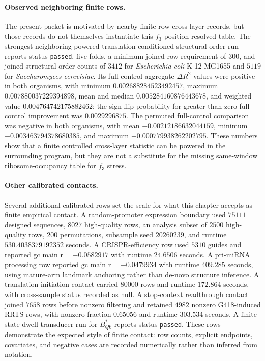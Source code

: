 \paragraph{Observed neighboring finite rows.}
The present packet is motivated by nearby finite-row cross-layer records, but those records do not themselves instantiate this $f_3$ position-resolved table.  The strongest neighboring powered translation-conditioned structural-order run reports status \texttt{passed}, five folds, a minimum joined-row requirement of $300$, and joined structural-order counts of $3412$ for \textit{Escherichia coli} K-12 MG1655 and $5119$ for \textit{Saccharomyces cerevisiae}.  Its full-control aggregate $\Delta R^2$ values were positive in both organisms, with minimum $0.002688284523492457$, maximum $0.007880037229394898$, mean and median $0.005284160876443678$, and weighted value $0.004764742175882462$; the sign-flip probability for greater-than-zero full-control improvement was $0.0029296875$.  The permuted full-control comparison was negative in both organisms, with mean $-0.00212186632044159$, minimum $-0.003463794378680385$, and maximum $-0.000779938262202795$.  These numbers show that a finite controlled cross-layer statistic can be powered in the surrounding program, but they are not a substitute for the missing same-window ribosome-occupancy table for $f_3$ stress.

\paragraph{Other calibrated contacts.}
Several additional calibrated rows set the scale for what this chapter accepts as finite empirical contact.  A random-promoter expression boundary used $75111$ designed sequences, $8027$ high-quality rows, an analysis subset of $2500$ high-quality rows, $200$ permutations, subsample seed $20260239$, and runtime $530.4038379192352$ seconds.  A CRISPR-efficiency row used $5310$ guides and reported $\mathrm{gc\_main\_r}=-0.0582917$ with runtime $24.6506$ seconds.  A pri-miRNA processing row reported $\mathrm{gc\_main\_r}=-0.0479934$ with runtime $409.285$ seconds, using mature-arm landmark anchoring rather than de-novo structure inference.  A translation-initiation contact carried $80000$ rows and runtime $172.864$ seconds, with cross-sample status recorded as null.  A stop-context readthrough contact joined $7658$ rows before nonzero filtering and retained $4982$ nonzero G418-induced RRTS rows, with nonzero fraction $0.65056$ and runtime $303.534$ seconds.  A finite-state dwell-transducer run for $B^*_{Q6}$ reports status \texttt{passed}.  These rows demonstrate the expected style of finite contact: row counts, explicit endpoints, covariates, and negative cases are recorded numerically rather than inferred from notation.

